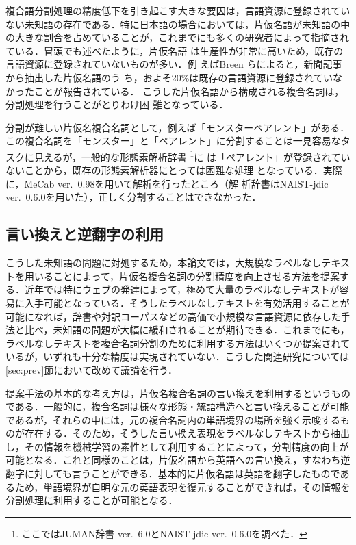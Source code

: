 \documentclass[japanese]{jnlp_1.4}
\begin{document}
複合語分割処理の精度低下を引き起こす大きな要因は，言語資源に登録されてい
ない未知語の存在である．特に日本語の場合においては，片仮名語が未知語の中
の大きな割合を占めていることが，これまでにも多くの研究者によって指摘され
ている\cite{Brill01,Nakazawa05,Breen09}．冒頭でも述べたように，片仮名語
は生産性が非常に高いため，既存の言語資源に登録されていないものが多い．例
えばBreen \citeyear{Breen09}らによると，新聞記事から抽出した片仮名語のう
ち，およそ20\%は既存の言語資源に登録されていなかったことが報告されている．
こうした片仮名語から構成される複合名詞は，分割処理を行うことがとりわけ困
難となっている\cite{Nakazawa05}．

分割が難しい片仮名複合名詞として，例えば「モンスターペアレント」がある．
この複合名詞を「モンスター」と「ペアレント」に分割することは一見容易なタ
スクに見えるが，一般的な形態素解析辞書
\footnote{ここではJUMAN辞書 ver.~6.0とNAIST-jdic ver.~0.6.0を調べた．}に
は「ペアレント」が登録されていないことから，既存の形態素解析器にとっては困難な処理
となっている．実際に，MeCab ver.~0.98を用いて解析を行ったところ（解
析辞書はNAIST-jdic ver.~0.6.0を用いた），正しく分割することはできなかった．


\subsection{言い換えと逆翻字の利用}

こうした未知語の問題に対処するため，本論文では，大規模なラベルなしテキス
トを用いることによって，片仮名複合名詞の分割精度を向上させる方法を提案す
る．近年では特にウェブの発達によって，極めて大量のラベルなしテキストが容
易に入手可能となっている．そうしたラベルなしテキストを有効活用することが
可能になれば，辞書や対訳コーパスなどの高価で小規模な言語資源に依存した手
法と比べ，未知語の問題が大幅に緩和されることが期待できる．これまでにも，
ラベルなしテキストを複合名詞分割のために利用する方法はいくつか提案されて
いるが，いずれも十分な精度は実現されていない．こうした関連研究については
\ref{sec:prev}節において改めて議論を行う．

提案手法の基本的な考え方は，片仮名複合名詞の言い換えを利用するというもの
である．一般的に，複合名詞は様々な形態・統語構造へと言い換えることが可能
であるが，それらの中には，元の複合名詞内の単語境界の場所を強く示唆するも
のが存在する．そのため，そうした言い換え表現をラベルなしテキストから抽出
し，その情報を機械学習の素性として利用することによって，分割精度の向上が
可能となる．これと同様のことは，片仮名語から英語への言い換え，すなわち逆
翻字に対しても言うことができる．基本的に片仮名語は英語を翻字したものであ
るため，単語境界が自明な元の英語表現を復元することができれば，その情報を
分割処理に利用することが可能となる．
\end{document}
